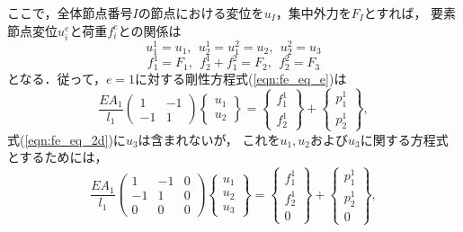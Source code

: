 \documentclass[10pt,a4j]{jarticle}
\begin{document}
ここで，全体節点番号$I$の節点における変位を$u_I$，集中外力を$F_I$とすれば，
要素節点変位$u^e_i$と荷重$f^e_i$との関係は
\begin{equation}
	u^1_1=u_1, \ \ u^1_2=u^2_1=u_2, \ \ u^2_2=u_3
	\label{eqn:ui2uI}
\end{equation}
\begin{equation}
	f^1_1=F_1, \ \ f^1_2+f^2_1=F_2, \ \ f^2_2=F_3
	\label{eqn:fi2FI}
\end{equation}
となる．従って，$e=1$に対する剛性方程式(\ref{eqn:fe_eq_e})は
\begin{equation}
	\frac{EA_1}{l_1}
	\left(
	\begin{array}{cc}
		1 & -1  \\
		-1 & 1 
	\end{array}
	\right)
	\left\{
	\begin{array}{c}
		u_1 \\
		u_2 
	\end{array}
	\right\}
	=
	\left\{
	\begin{array}{c}
		f^1_1  \\
		f^1_2 
	\end{array}
	\right\}
	+
	\left\{
	\begin{array}{c}
		p^1_1 \\
		p^1_2 
	\end{array}
	\right\}, 
	\label{eqn:fe_eq_1_2d}
\end{equation}
式(\ref{eqn:fe_eq_2d})に$u_3$は含まれないが，
これを$u_1,u_2$および$u_3$に関する方程式とするためには，
\begin{equation}
	\frac{EA_1}{l_1}
	\left(
	\begin{array}{ccc}
		1 & -1 & 0 \\
		-1 & 1  & 0 \\
		0 & 0  & 0 
	\end{array}
	\right)
	\left\{
	\begin{array}{c}
		u_1 \\
		u_2 \\
		u_3
	\end{array}
	\right\}
	=
	\left\{
	\begin{array}{c}
		f^1_1  \\
		f^1_2  \\
		0
	\end{array}
	\right\}
	+
	\left\{
	\begin{array}{c}
		p^1_1 \\
		p^1_2 \\
		0
	\end{array}
	\right\}, 
	\label{eqn:fe_eq_1}
\end{equation}
\end{document}
